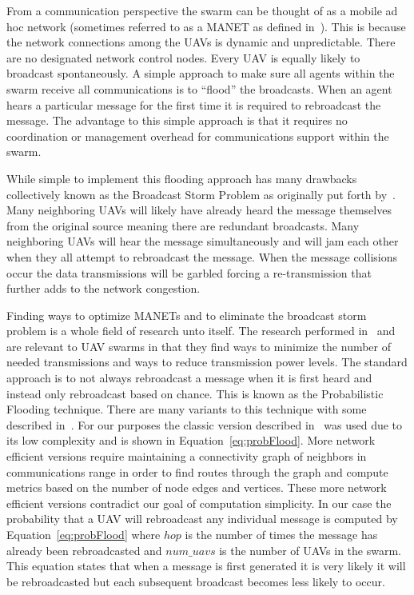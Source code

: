 From a communication perspective the swarm can be thought of as a mobile ad hoc network (sometimes referred to as a MANET as defined in~\textcite{manet_definition}).  This is because the network connections among the UAVs is dynamic and unpredictable.  There are no designated network control nodes.  Every UAV is equally likely to broadcast spontaneously.  A simple approach to make sure all agents within the swarm receive all communications is to ``flood'' the broadcasts.  When an agent hears a particular message for the first time it is required to rebroadcast the message.  The advantage to this simple approach is that it requires no coordination or management overhead for communications support within the swarm.

While simple to implement this flooding approach has many drawbacks collectively known as the Broadcast Storm Problem as originally put forth by~\textcite{bstorm}.  Many neighboring UAVs will likely have already heard the message themselves from the original source meaning there are redundant broadcasts.  Many neighboring UAVs will hear the message simultaneously and will jam each other when they all attempt to rebroadcast the message.  When the message collisions occur the data transmissions will be garbled forcing a re-transmission that further adds to the network congestion.
	
Finding ways to optimize MANETs and to eliminate the broadcast storm problem is a whole field of research unto itself.  The research performed in~\textcite{epidemicManets} and ~\textcite{analysisOptNodeDen} are relevant to UAV swarms in that they find ways to minimize the number of needed transmissions and ways to reduce transmission power levels.  The standard approach is to not always rebroadcast a message when it is first heard and instead only rebroadcast based on chance.  This is known as the Probabilistic Flooding technique.  There are many variants to this technique with some described in~\textcite{probFloodVariants}.  For our purposes the classic version described in~\textcite{simpleProbFlood} was used due to its low complexity and is shown in Equation~\ref{eq:probFlood}.  More network efficient versions require maintaining a connectivity graph of neighbors in communications range in order to find routes through the graph and compute metrics based on the number of node edges and vertices.  These more network efficient versions contradict our goal of computation simplicity.  In our case the probability that a UAV will rebroadcast any individual message is computed by Equation~\ref{eq:probFlood} where $hop$ is the number of times the message has already been rebroadcasted and $num\_uavs$ is the number of UAVs in the swarm.  This equation states that when a message is first generated it is very likely it will be rebroadcasted but each subsequent broadcast becomes less likely to occur.


